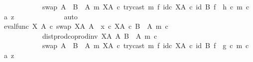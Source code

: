 \begin{isabellebody}
\ \ \ \ \ \ \ \ \ \ \ \ swap\ {\isacharparenleft}{\kern0pt}A\ {\isasymCoprod}\ {\isacharparenleft}{\kern0pt}B\ {\isasymsetminus}\ {\isacharparenleft}{\kern0pt}A{\isacharcomma}{\kern0pt}\ m{\isacharparenright}{\kern0pt}{\isacharparenright}{\kern0pt}{\isacharparenright}{\kern0pt}\ {\isacharparenleft}{\kern0pt}X\isactrlbsup A\isactrlesup {\isacharparenright}{\kern0pt}\ {\isasymcirc}\isactrlsub c\ try{\isacharunderscore}{\kern0pt}cast\ m\ {\isasymtimes}\isactrlsub f\ id\isactrlsub c\ {\isacharparenleft}{\kern0pt}X\isactrlbsup A\isactrlesup {\isacharparenright}{\kern0pt}{\isacharparenright}{\kern0pt}\ {\isasymcirc}\isactrlsub c\ {\isacharparenleft}{\kern0pt}id\ B\ {\isasymtimes}\isactrlsub f\ \ h{\isacharparenright}{\kern0pt}{\isacharparenright}{\kern0pt}\ {\isasymcirc}\isactrlsub c\ {\isasymlangle}m\ {\isasymcirc}\isactrlsub c\ a{\isacharcomma}{\kern0pt}\ z{\isasymrangle}{\isachardoublequoteclose}\isanewline
\ \ \ \ \ \ \ \ \ \ \ \ \isamarkupfalse%
\ auto\isanewline
\ \ \ \ \ \ \ \ \ \ \isamarkupfalse%
\ \isamarkupfalse%
\ {\isachardoublequoteopen}{\isacharparenleft}{\kern0pt}{\isacharparenleft}{\kern0pt}eval{\isacharunderscore}{\kern0pt}func\ X\ A\ {\isasymcirc}\isactrlsub c\ swap\ {\isacharparenleft}{\kern0pt}X\isactrlbsup A\isactrlesup {\isacharparenright}{\kern0pt}\ A{\isacharparenright}{\kern0pt}\ {\isasymamalg}\ {\isacharparenleft}{\kern0pt}x\ {\isasymcirc}\isactrlsub c\ {\isasymbeta}\isactrlbsub X\isactrlbsup A\isactrlesup \ {\isasymtimes}\isactrlsub c\ {\isacharparenleft}{\kern0pt}B\ {\isasymsetminus}\ {\isacharparenleft}{\kern0pt}A{\isacharcomma}{\kern0pt}\ m{\isacharparenright}{\kern0pt}{\isacharparenright}{\kern0pt}\isactrlesub {\isacharparenright}{\kern0pt}\ {\isasymcirc}\isactrlsub c\isanewline
\ \ \ \ \ \ \ \ \ \ \ \ dist{\isacharunderscore}{\kern0pt}prod{\isacharunderscore}{\kern0pt}coprod{\isacharunderscore}{\kern0pt}inv\ {\isacharparenleft}{\kern0pt}X\isactrlbsup A\isactrlesup {\isacharparenright}{\kern0pt}\ A\ {\isacharparenleft}{\kern0pt}B\ {\isasymsetminus}\ {\isacharparenleft}{\kern0pt}A{\isacharcomma}{\kern0pt}\ m{\isacharparenright}{\kern0pt}{\isacharparenright}{\kern0pt}\ {\isasymcirc}\isactrlsub c\isanewline
\ \ \ \ \ \ \ \ \ \ \ \ swap\ {\isacharparenleft}{\kern0pt}A\ {\isasymCoprod}\ {\isacharparenleft}{\kern0pt}B\ {\isasymsetminus}\ {\isacharparenleft}{\kern0pt}A{\isacharcomma}{\kern0pt}\ m{\isacharparenright}{\kern0pt}{\isacharparenright}{\kern0pt}{\isacharparenright}{\kern0pt}\ {\isacharparenleft}{\kern0pt}X\isactrlbsup A\isactrlesup {\isacharparenright}{\kern0pt}\ {\isasymcirc}\isactrlsub c\ try{\isacharunderscore}{\kern0pt}cast\ m\ {\isasymtimes}\isactrlsub f\ id\isactrlsub c\ {\isacharparenleft}{\kern0pt}X\isactrlbsup A\isactrlesup {\isacharparenright}{\kern0pt}{\isacharparenright}{\kern0pt}\ {\isasymcirc}\isactrlsub c\ {\isacharparenleft}{\kern0pt}id\ B\ {\isasymtimes}\isactrlsub f\ \ g{\isacharparenright}{\kern0pt}\ {\isasymcirc}\isactrlsub c\ {\isasymlangle}m\ {\isasymcirc}\isactrlsub c\ a{\isacharcomma}{\kern0pt}\ z{\isasymrangle}\isanewline

\end{isabellebody}
